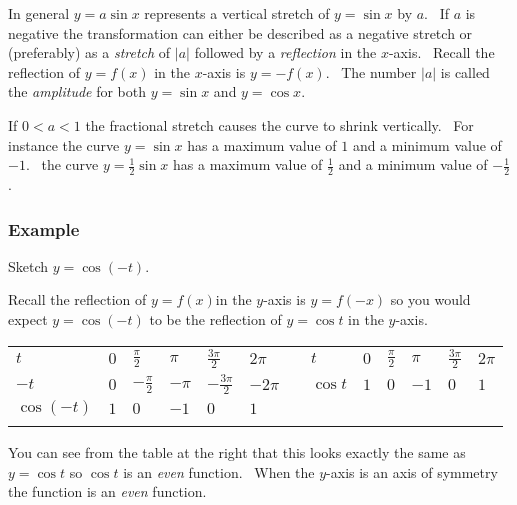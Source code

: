 \setlength\fboxrule{0.01in}\setlength\fboxsep{0.2in}


In general $y =a \sin  x$ represents a vertical stretch of $y =\sin  x$ by $a$. \ If $a$ is negative the transformation can either be described as a negative stretch or (preferably) as a \emph{stretch}
of $\left \vert a\right \vert $ followed by a \emph{reflection} in the $x$-axis. \ Recall the reflection of $y =f \left (x\right )$ in the $x$-axis is $y = -f \left (x\right )$. \ The number $\left \vert a\right \vert $ is called the \emph{amplitude} for both $y =\sin  x$ and $y =\cos  x\text{.}$ 

If $0 <a <1$ the fractional stretch causes the curve to shrink vertically. \ For instance the curve
$y =\sin  x$ has a maximum value of $1$ and a minimum value of $ -1$. \ the curve $y =\frac{1}{2} \sin  x$ has a maximum value of $\frac{1}{2}$ and a minimum value of $ -\frac{1}{2}$. 

\subsubsection{Example}
Sketch $y =\cos  ( -t)\text{.}$ 

Recall the reflection of $y =f (x)$in the $y$-axis is $y =f ( -x)$ so you would expect $y =\cos  ( -t)$ to be the reflection of $y =\cos  t$ in the $y$-axis. 


\begin{tabular}[c]{|l|l|l|l|l|l|lllllll}
$t$  & $0$  & $\frac{\pi }{2}$  & $\pi $  & $\frac{3 \pi }{2}$  & $2 \pi $  &  & $t$  & $0$  & $\frac{\pi }{2}$  & $\pi $  & $\frac{3 \pi }{2}$  & $2 \pi $  \\
 $ -t$  & $0$  & $ -\frac{\pi }{2}$  & $ -\pi $  & $ -\frac{3 \pi }{2}$  & $ -2 \pi $  &  & $\cos  t$  & $1$  & $0$  & $ -1$  & $0$  & $1$  \\
 $\cos  \left ( -t\right )$  & $1$  & $0$  & $ -1$  & $0$  & $1$  &  &  &  &  &  &  &  \\
\multicolumn{1}{|l}{
}
\end{tabular}

You can see from the table at the right that this looks exactly the same as
$y =\cos  t$ so $\cos  t$ is an \emph{even} function. \ When the $y$-axis is an axis of symmetry the function is an \emph{even} function. 

   
\setlength\fboxrule{0.01in}\setlength\fboxsep{0.2in}


